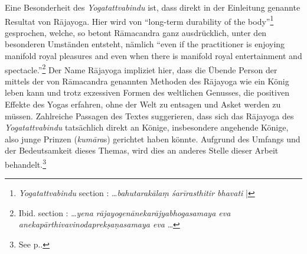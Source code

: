 Eine Besonderheit des \emph{Yogatattvabindu} ist, dass direkt in der Einleitung genannte Resultat von Rājayoga. Hier wird von ``long-term durability of the body''\footnote{\emph{Yogatattvabindu} section : \ldots \textit{bahutarakālaṃ śarīrasthitir bhavati} |} gesprochen, welche, so betont Rāmacandra ganz ausdrücklich, unter den besonderen Umständen entsteht, nämlich ``even if the practitioner is enjoying manifold royal pleasures and even when there is manifold royal entertainment and spectacle.''\footnote{Ibid. section : \ldots \textit{yena rājayogenānekarājyabhogasamaya eva anekapārthivavinodaprekṣaṇasamaya eva} \ldots} Der Name Rājayoga impliziet hier, dass die Übende Person der mittels der von Rāmacandra genannten Methoden des Rājayoga wie ein König leben kann und trotz exzessiven Formen des weltlichen Genusses, die positiven Effekte des Yogas erfahren, ohne der Welt zu entsagen und Asket werden zu müssen. Zahlreiche Passagen des Textes suggerieren, dass sich das Rājayoga des \textit{Yogatattvabindu} tatsächlich direkt an Könige, insbesondere angehende Könige, also junge Prinzen (\textit{kumāra}s) gerichtet haben könnte. Aufgrund des Umfangs und der Bedeutsamkeit dieses Themas, wird dies an anderes Stelle dieser Arbeit behandelt.\footnote{See p.\pageref{ytbaudience}.}

